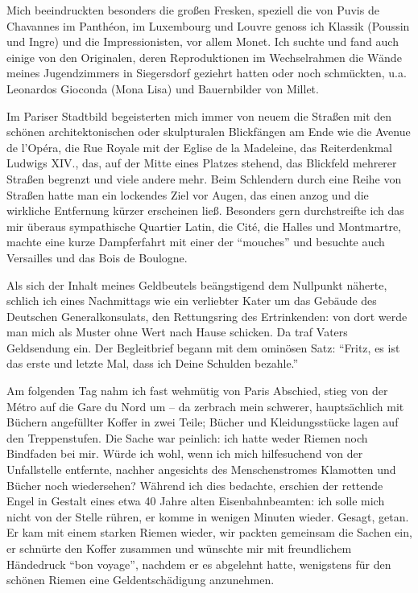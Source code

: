 Mich beeindruckten besonders die großen Fresken, speziell die von Puvis de Chavannes im Panthéon, im Luxembourg und Louvre genoss ich Klassik (Poussin und Ingre) und die Impressionisten, vor allem Monet. Ich suchte und fand auch einige von den Originalen, deren Reproduktionen im Wechselrahmen die Wände meines Jugendzimmers in Siegersdorf geziehrt hatten oder noch schmückten, u.a. Leonardos Gioconda (Mona Lisa) und Bauernbilder von Millet.

Im Pariser Stadtbild begeisterten mich immer von neuem die Straßen mit den schönen architektonischen oder skulpturalen Blickfängen am Ende wie die Avenue de l'Opéra, die Rue Royale mit der Eglise de la Madeleine, das Reiterdenkmal Ludwigs XIV., das, auf der Mitte eines Platzes stehend, das Blickfeld mehrerer Straßen begrenzt und viele andere mehr. Beim Schlendern durch eine Reihe von Straßen hatte man ein lockendes Ziel vor Augen, das einen anzog und die wirkliche Entfernung kürzer erscheinen ließ. Besonders gern durchstreifte ich das mir überaus sympathische Quartier Latin, die Cité, die Halles und Montmartre, machte eine kurze Dampferfahrt mit einer der \enquote{mouches} und besuchte auch Versailles und das Bois de Boulogne.

Als sich der Inhalt meines Geldbeutels beängstigend dem Nullpunkt näherte, schlich ich eines Nachmittags wie ein verliebter Kater um das Gebäude des Deutschen Generalkonsulats, den Rettungsring des Ertrinkenden: von dort werde man mich als Muster ohne Wert nach Hause schicken. Da traf Vaters Geldsendung ein. Der Begleitbrief begann mit dem ominösen Satz: \enquote{Fritz, es ist das erste und letzte Mal, dass ich Deine Schulden bezahle.}

Am folgenden Tag nahm ich fast wehmütig von Paris Abschied, stieg von der Métro auf die Gare du Nord um -- da zerbrach mein schwerer, hauptsächlich mit Büchern angefüllter Koffer in zwei Teile; Bücher und Kleidungsstücke lagen auf den Treppenstufen. Die Sache war peinlich: ich hatte weder Riemen noch Bindfaden bei mir. Würde ich wohl, wenn ich mich hilfesuchend von der Unfallstelle entfernte, nachher angesichts des Menschenstromes Klamotten und Bücher noch wiedersehen? Während ich dies bedachte, erschien der rettende Engel in Gestalt eines etwa 40 Jahre alten Eisenbahnbeamten: ich solle mich nicht von der Stelle rühren, er komme in wenigen Minuten wieder. Gesagt, getan. Er kam mit einem starken Riemen wieder, wir packten gemeinsam die Sachen ein, er schnürte den Koffer zusammen und wünschte mir mit freundlichem Händedruck \enquote{bon voyage}, nachdem er es abgelehnt hatte, wenigstens für den schönen Riemen eine Geldentschädigung anzunehmen.

